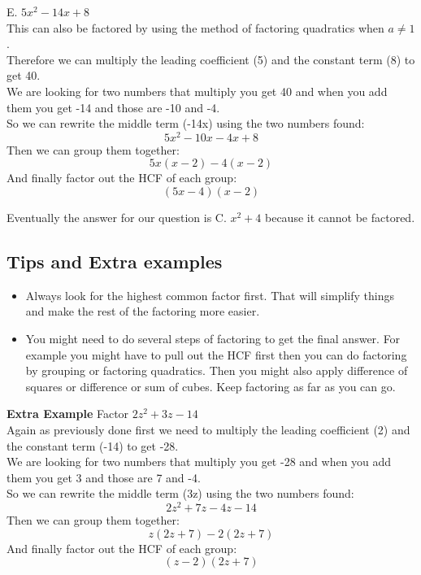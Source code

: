 E. $5x^2-14x+8$ \\
This can also be factored by using the method of factoring quadratics when $a \neq 1$. \\
Therefore we can multiply the leading coefficient (5) and the constant term (8) to get 40. \\
We are looking for two numbers that multiply you get 40 and when you add them you get -14 and those are -10 and -4. \\
So we can rewrite the middle term (-14x) using the two numbers found:
$$ 5x^2 - 10x - 4x + 8 $$ 
Then we can group them together:
$$ 5x(x - 2) - 4(x - 2) $$
And finally factor out the HCF of each group:
$$ (5x - 4)(x - 2) $$

Eventually the answer for our question is C. $x^2 + 4$ because it cannot be factored.

\subsection{Tips and Extra examples}
\begin{itemize}
    \item Always look for the highest common factor first. That will simplify things and make the rest of the factoring more easier. 
    \item You might need to do several steps of factoring to get the final answer. For example you might have to pull out the HCF first then you can do factoring by grouping or factoring quadratics. Then you might also apply difference of squares or difference or sum of cubes. Keep factoring as far as you can go.
\end{itemize}

\textbf{Extra Example} Factor $2z^2 + 3z -14$ \\
Again as previously done first we need to multiply the leading coefficient (2) and the constant term (-14) to get -28. \\ 
We are looking for two numbers that multiply you get -28 and when you add them you get 3 and those are 7 and -4. \\
So we can rewrite the middle term (3z) using the two numbers found:
$$ 2z^2 + 7z - 4z - 14 $$ 
Then we can group them together:
$$ z(2z + 7) - 2(2z + 7) $$
And finally factor out the HCF of each group:
$$ (z - 2)(2z + 7) $$

